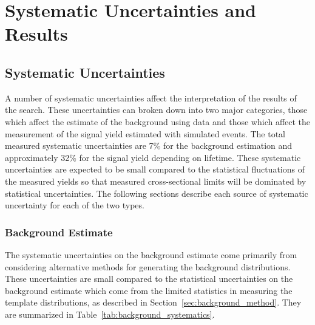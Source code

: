 \chapter{Systematic Uncertainties and Results}

\label{ch:results}

\section{Systematic Uncertainties}

A number of systematic uncertainties affect the interpretation of the results of the search.
These uncertainties can broken down into two major categories, those which affect the estimate of the background using data and those which affect the measurement of the signal yield estimated with simulated events.
The total measured systematic uncertainties are 7\% for the background estimation and approximately 32\% for the signal yield depending on lifetime.
These systematic uncertainties are expected to be small compared to the statistical fluctuations of the measured yields so that measured cross-sectional limits will be dominated by statistical uncertainties.
The following sections describe each source of systematic uncertainty for each of the two types.

\subsection{Background Estimate}

The systematic uncertainties on the background estimate come primarily from considering alternative methods for generating the background distributions.
These uncertainties are small compared to the statistical uncertainties on the background estimate which come from the limited statistics in measuring the template distributions, as described in Section~\ref{sec:background_method}.
They are summarized in Table~\ref{tab:background_systematics}.

